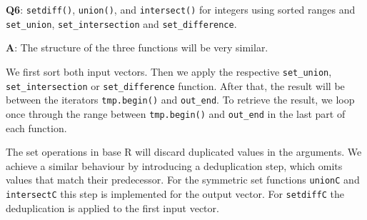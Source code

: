 \documentclass[
]{krantz}
\begin{document}
\textbf{{Q6}}: \texttt{setdiff()}, \texttt{union()}, and \texttt{intersect()} for integers using sorted ranges and \texttt{set\_union}, \texttt{set\_intersection} and \texttt{set\_difference}.

\textbf{{A}}: The structure of the three functions will be very similar.

We first sort both input vectors. Then we apply the respective \texttt{set\_union}, \texttt{set\_intersection} or \texttt{set\_difference} function. After that, the result will be between the iterators \texttt{tmp.begin()} and \texttt{out\_end}. To retrieve the result, we loop once through the range between \texttt{tmp.begin()} and \texttt{out\_end} in the last part of each function.

The set operations in base R will discard duplicated values in the arguments. We achieve a similar behaviour by introducing a deduplication step, which omits values that match their predecessor. For the symmetric set functions \texttt{unionC} and \texttt{intersectC} this step is implemented for the output vector. For \texttt{setdiffC} the deduplication is applied to the first input vector.
\end{document}
